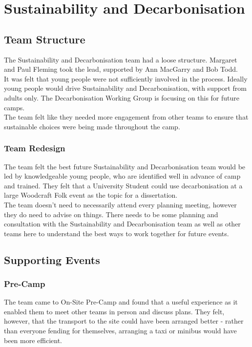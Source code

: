 \chapter{Sustainability and Decarbonisation}
\section{Team Structure}
The Sustainability and Decarbonisation team had a loose structure. Margaret and Paul Fleming took the lead, supported by Ann MacGarry and Bob Todd.\\

It was felt that young people were not sufficiently involved in the process. Ideally young people would drive Sustainability and Decarbonisation, with support from adults only. The Decarbonisation Working Group is focusing on this for future camps.\\ 

The team felt like they needed more engagement from other teams to ensure that sustainable choices were being made throughout the camp.
\subsection{Team Redesign}
The team felt the best future Sustainability and Decarbonisation team would be led by knowledgeable young people, who are identified well in advance of camp and trained. They felt that a University Student could use decarbonisation at a large Woodcraft Folk event as the topic for a dissertation.\\

The team doesn't need to necessarily attend every planning meeting, however they do need to advise on things. There needs to be some planning and consultation with the Sustainability and Decarbonisation team as well as other teams here to understand the best ways to work together for future events.

\section{Supporting Events}
\subsection{Pre-Camp}
The team came to On-Site Pre-Camp and found that a useful experience as it enabled them to meet other teams in person and discuss plans. They felt, however, that the transport to the site could have been arranged better - rather than everyone fending for themselves, arranging a taxi or minibus would have been more efficient.

